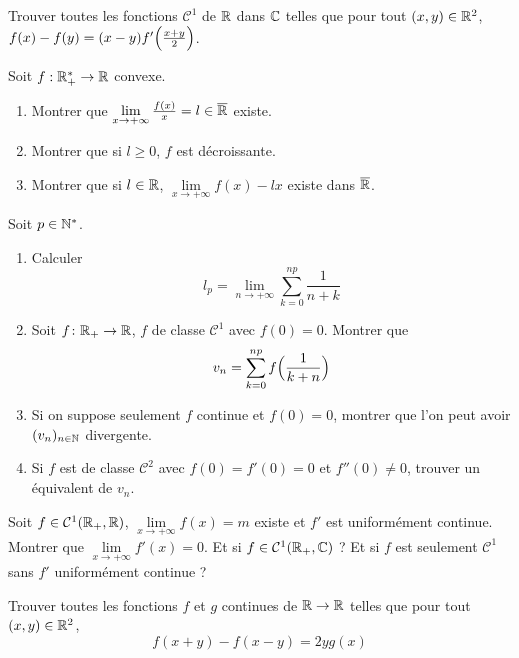 \documentclass[12pt]{article}
\begin{document}
\begin{exercise}
	Trouver toutes les fonctions $\mathcal{C}^{1}$ de $\mathbb{R}$ dans $\mathbb{C}$ telles que pour tout $(x,y)\in\mathbb{R}^{2}$, $f(x)-f(y)=(x-y)f'\Bigl(\frac{x+y}{2}\Bigr)$.
\end{exercise}

\begin{exercise}
	Soit $f:\mathbb{R}_{+}^{*}\to\mathbb{R}$ convexe.
	\begin{enumerate}
		\item Montrer que $\lim\limits_{x\to+\infty}\frac{f(x)}{x}=l\in\overline{\mathbb{R}}$ existe.
		\item Montrer que si $l\geqslant0$, $f$ est décroissante.
		\item Montrer que si $l\in\mathbb{R}$, $\lim\limits_{x\to+\infty}f(x)-lx$ existe dans $\overline{\mathbb{R}}$.
	\end{enumerate}
\end{exercise}

\begin{exercise}
	Soit $p\in\mathbb{N}^{*}$.
	\begin{enumerate}
		\item Calculer 
		$$l_{p}=\lim\limits_{n\to+\infty}\sum_{k=0}^{np}\frac{1}{n+k}$$
		\item Soit $f\colon\mathbb{R}_{+}\to\mathbb{R}$, $f$ de classe $\mathcal{C}^{1}$ avec $f(0)=0$. Montrer que 
		$$v_{n}=\sum_{k=0}^{np}f\Bigl(\frac{1}{k+n}\Bigr)$$
		\item Si on suppose seulement $f$ continue et $f(0)=0$, montrer que l'on peut avoir $(v_{n})_{n\in\mathbb{N}}$ divergente.
		\item Si $f$ est de classe $\mathcal{C}^{2}$ avec $f(0)=f'(0)=0$ et $f''(0)\neq0$, trouver un équivalent de $v_{n}$.
	\end{enumerate}
\end{exercise}

\begin{exercise}
	Soit $f\in\mathcal{C}^{1}(\mathbb{R}_{+},\mathbb{R})$, $\lim\limits_{x\to+\infty}f(x)=m$ existe et $f'$ est uniformément continue. Montrer que $\lim\limits_{x\to+\infty}f'(x)=0$. Et si $f\in\mathcal{C}^{1}(\mathbb{R}_{+},\mathbb{C})$ ? Et si $f$ est seulement $\mathcal{C}^{1}$ sans $f'$ uniformément continue ?
\end{exercise}

\begin{exercise}
	Trouver toutes les fonctions $f$ et $g$ continues de $\mathbb{R}\to\mathbb{R}$ telles que pour tout $(x,y)\in\mathbb{R}^{2}$,
	$$f(x+y)-f(x-y)=2yg(x)$$
\end{exercise}
\end{document}
